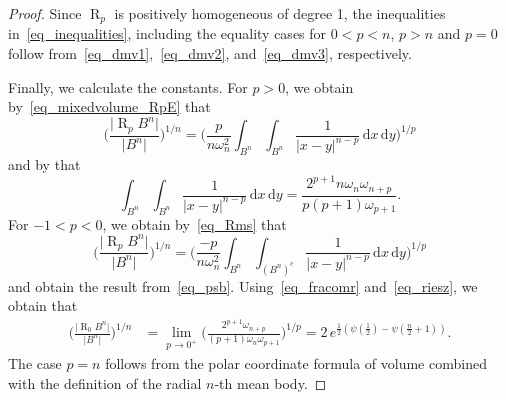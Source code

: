 \documentclass{amsart}
\newcommand{\omr}[1]{\operatorname{R}_{#1}}
\newcommand{\Bvtex}{{B^n}}
\newcommand{\dvtex}{\,\mathrm{d}}
\newcommand{\vol}[1]{ \vert #1\vert}
\begin{document}
\begin{proof}
Since $\omr p$ is positively homogeneous of degree 1, the inequalities
in~\eqref{eq_inequalities}, including the equality cases for
$0< p<n$, $p>n$ and $p=0$ follow from~\eqref{eq_dmv1},~\eqref{eq_dmv2}, and~\eqref{eq_dmv3}, respectively.

Finally, we calculate the constants. For $p>0$, we obtain by~\eqref{eq_mixedvolume_RpE} that
%
\begin{equation}
\label{eq_fracomr}
\Big(\frac{\vol{\omr p \Bvtex}}{\vol{\Bvtex}}\Big)^{1/n} = \Big(
\frac {p}{n\omega _{n}^{2}}\int _{\Bvtex }\int _{\Bvtex}
\frac{1}{\vert x-y\vert ^{n-p}}\dvtex x\dvtex y\Big)^{1/p}
\end{equation}
%
and by \cite[Theorem 7.2.7 and Theorem 8.6.6]{SchneiderWeil} that
%
\begin{equation}
\label{eq_riesz}
\int _{\Bvtex }\int _{\Bvtex} \frac{1}{\vert x-y\vert ^{n-p}}\dvtex x\dvtex y=
\frac{2^{p+1}n\omega _{n}\omega _{n+p}}{p(p+1)\omega _{p+1}}.
\end{equation}
%
For $-1<p<0$, we obtain by~\eqref{eq_Rms} that
%
\begin{equation}
\Big(\frac{\vol{\omr p \Bvtex}}{\vol{\Bvtex}}\Big)^{1/n} = \Big(
\frac {-p}{n\omega _{n}^{2}}\int _{\Bvtex }\int _{(\Bvtex )^{c}}
\frac{1}{\vert x-y\vert ^{n-p}}\dvtex x\dvtex y\Big)^{1/p}
\nonumber \end{equation}
%
and obtain the result from~\eqref{eq_psb}. Using~\eqref{eq_fracomr} and~\eqref{eq_riesz}, we obtain that
%
\begin{align}
\Big(\frac{\vol{\omr 0 \Bvtex}}{\vol{\Bvtex}}\Big)^{1/n} &=\lim _{p\to 0^{+}}
\Big(\frac{2^{p+1}\omega _{n+p}}{(p+1)\omega _{n}\omega _{p+1}}\Big)^{1/p}
= {2\, e^{\frac{1}{2}(\psi (\frac{1}{2})-\psi (\frac{n}{2}+1))}}.
\nonumber \end{align}
%
The case $p=n$ follows from the polar coordinate formula of volume combined
with the definition of the radial $n$-th mean body.
\end{proof}




%
\end{document}
